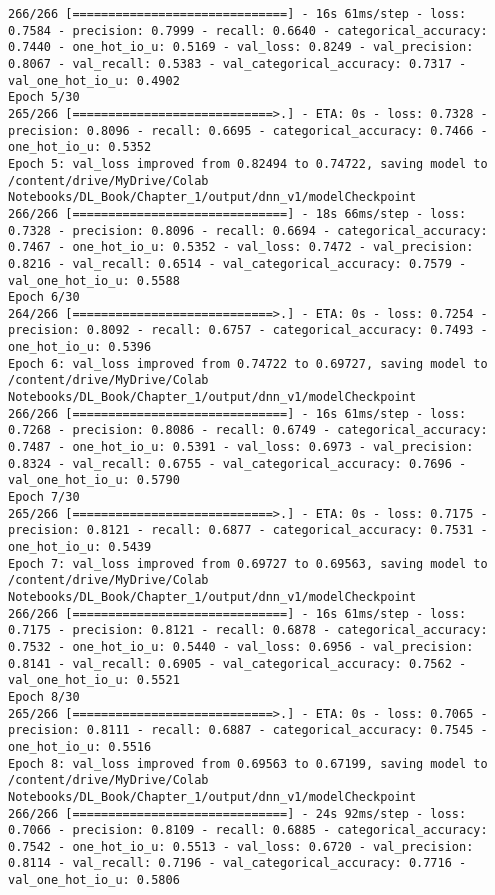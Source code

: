 \documentclass[
  letterpaper,
  DIV=11,
  numbers=noendperiod]{scrreprt}
\begin{document}
\begin{verbatim}
266/266 [==============================] - 16s 61ms/step - loss: 0.7584 - precision: 0.7999 - recall: 0.6640 - categorical_accuracy: 0.7440 - one_hot_io_u: 0.5169 - val_loss: 0.8249 - val_precision: 0.8067 - val_recall: 0.5383 - val_categorical_accuracy: 0.7317 - val_one_hot_io_u: 0.4902
Epoch 5/30
265/266 [============================>.] - ETA: 0s - loss: 0.7328 - precision: 0.8096 - recall: 0.6695 - categorical_accuracy: 0.7466 - one_hot_io_u: 0.5352
Epoch 5: val_loss improved from 0.82494 to 0.74722, saving model to /content/drive/MyDrive/Colab Notebooks/DL_Book/Chapter_1/output/dnn_v1/modelCheckpoint
266/266 [==============================] - 18s 66ms/step - loss: 0.7328 - precision: 0.8096 - recall: 0.6694 - categorical_accuracy: 0.7467 - one_hot_io_u: 0.5352 - val_loss: 0.7472 - val_precision: 0.8216 - val_recall: 0.6514 - val_categorical_accuracy: 0.7579 - val_one_hot_io_u: 0.5588
Epoch 6/30
264/266 [============================>.] - ETA: 0s - loss: 0.7254 - precision: 0.8092 - recall: 0.6757 - categorical_accuracy: 0.7493 - one_hot_io_u: 0.5396
Epoch 6: val_loss improved from 0.74722 to 0.69727, saving model to /content/drive/MyDrive/Colab Notebooks/DL_Book/Chapter_1/output/dnn_v1/modelCheckpoint
266/266 [==============================] - 16s 61ms/step - loss: 0.7268 - precision: 0.8086 - recall: 0.6749 - categorical_accuracy: 0.7487 - one_hot_io_u: 0.5391 - val_loss: 0.6973 - val_precision: 0.8324 - val_recall: 0.6755 - val_categorical_accuracy: 0.7696 - val_one_hot_io_u: 0.5790
Epoch 7/30
265/266 [============================>.] - ETA: 0s - loss: 0.7175 - precision: 0.8121 - recall: 0.6877 - categorical_accuracy: 0.7531 - one_hot_io_u: 0.5439
Epoch 7: val_loss improved from 0.69727 to 0.69563, saving model to /content/drive/MyDrive/Colab Notebooks/DL_Book/Chapter_1/output/dnn_v1/modelCheckpoint
266/266 [==============================] - 16s 61ms/step - loss: 0.7175 - precision: 0.8121 - recall: 0.6878 - categorical_accuracy: 0.7532 - one_hot_io_u: 0.5440 - val_loss: 0.6956 - val_precision: 0.8141 - val_recall: 0.6905 - val_categorical_accuracy: 0.7562 - val_one_hot_io_u: 0.5521
Epoch 8/30
265/266 [============================>.] - ETA: 0s - loss: 0.7065 - precision: 0.8111 - recall: 0.6887 - categorical_accuracy: 0.7545 - one_hot_io_u: 0.5516
Epoch 8: val_loss improved from 0.69563 to 0.67199, saving model to /content/drive/MyDrive/Colab Notebooks/DL_Book/Chapter_1/output/dnn_v1/modelCheckpoint
266/266 [==============================] - 24s 92ms/step - loss: 0.7066 - precision: 0.8109 - recall: 0.6885 - categorical_accuracy: 0.7542 - one_hot_io_u: 0.5513 - val_loss: 0.6720 - val_precision: 0.8114 - val_recall: 0.7196 - val_categorical_accuracy: 0.7716 - val_one_hot_io_u: 0.5806

\end{verbatim}
\end{document}
